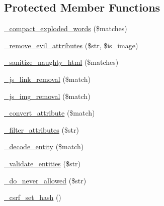 \subsection*{Protected Member Functions}
\begin{DoxyCompactItemize}
\item 
\hyperlink{class_c_i___security_adfb0e251ae35ae40303a302d253c3ab2}{\-\_\-compact\-\_\-exploded\-\_\-words} (\$matches)
\item 
\hyperlink{class_c_i___security_a37c160ddffea957e9eb03dbfd3471a78}{\-\_\-remove\-\_\-evil\-\_\-attributes} (\$str, \$is\-\_\-image)
\item 
\hyperlink{class_c_i___security_af67689597607833df370031fb799c92b}{\-\_\-sanitize\-\_\-naughty\-\_\-html} (\$matches)
\item 
\hyperlink{class_c_i___security_a6b1744acaf85e05c65ab17242dea4f06}{\-\_\-js\-\_\-link\-\_\-removal} (\$match)
\item 
\hyperlink{class_c_i___security_a5c5e91dc8e3df0174e4e074dd375a8db}{\-\_\-js\-\_\-img\-\_\-removal} (\$match)
\item 
\hyperlink{class_c_i___security_ae16451bcdc769285c499cbf8068b3523}{\-\_\-convert\-\_\-attribute} (\$match)
\item 
\hyperlink{class_c_i___security_aa385a9c7527f5eece656b9cac73979d3}{\-\_\-filter\-\_\-attributes} (\$str)
\item 
\hyperlink{class_c_i___security_a5289832cb3ae9cee3c12e82ede958874}{\-\_\-decode\-\_\-entity} (\$match)
\item 
\hyperlink{class_c_i___security_a31b2c9ae75f39b9b38fe05c494bb0f79}{\-\_\-validate\-\_\-entities} (\$str)
\item 
\hyperlink{class_c_i___security_a61217e43f888cdf8afb1fba16b5cd9f6}{\-\_\-do\-\_\-never\-\_\-allowed} (\$str)
\item 
\hyperlink{class_c_i___security_a7064dd5501c1dfab05ba6ac8838beb01}{\-\_\-csrf\-\_\-set\-\_\-hash} ()
\end{DoxyCompactItemize}
